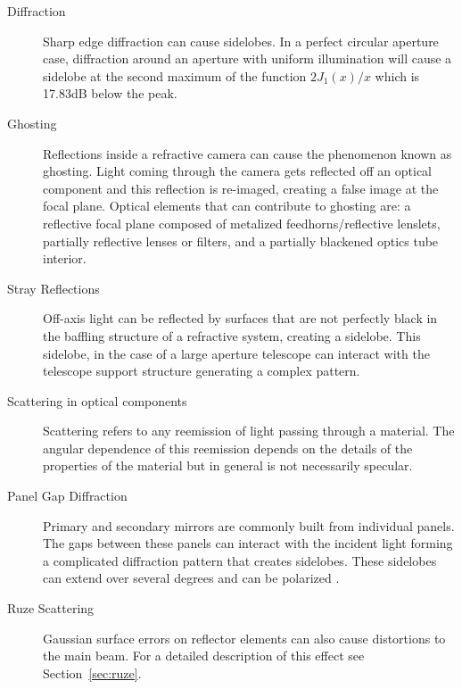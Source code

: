 \begin{description}
\item[Diffraction]

Sharp edge diffraction can cause sidelobes. In a perfect circular aperture case, diffraction around an aperture with uniform illumination will cause a sidelobe at the second maximum of the function $2J_1(x)/x$ which is 17.83dB below the peak.

\item[Ghosting]

Reflections inside a refractive camera can cause the phenomenon known as ghosting. Light coming through the camera gets reflected off an optical component and this reflection is re-imaged, creating a false image at the focal plane. Optical elements that can contribute to ghosting are: a reflective focal plane composed of metalized feedhorns/reflective lenslets, partially reflective lenses or filters, and a partially blackened optics tube interior.

\item[Stray Reflections]

Off-axis light can be reflected by surfaces that are not perfectly black in the baffling structure of a refractive system, creating a sidelobe. This sidelobe, in the case of a large aperture telescope can interact with the telescope support structure generating a complex pattern.

\item[Scattering in optical components]

Scattering refers to any reemission of light passing through a material. The angular dependence of this reemission depends on the details of the properties of the material but in general is not necessarily specular.

\item[Panel Gap Diffraction]
Primary and secondary mirrors are commonly built from individual panels. The gaps between these panels can interact with the incident light forming a complicated diffraction pattern that creates sidelobes. These sidelobes can extend over several degrees and can be polarized \cite{fluxa_rojas_far_2016}.

\item[Ruze Scattering]
Gaussian surface errors on reflector elements can also cause distortions to the main beam. For a detailed description of this effect see Section~\ref{sec:ruze}.

\end{description}

